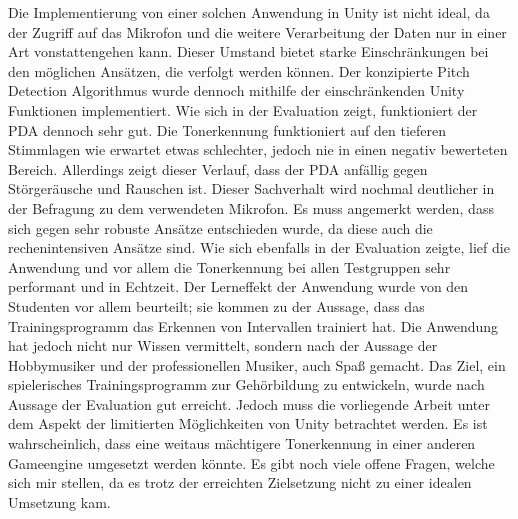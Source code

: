 Die Implementierung von einer solchen Anwendung in Unity ist nicht ideal, da der Zugriff auf das Mikrofon und die weitere Verarbeitung der Daten nur in einer Art vonstattengehen kann. Dieser Umstand bietet starke Einschränkungen bei den möglichen Ansätzen, die verfolgt werden können. Der konzipierte Pitch Detection Algorithmus wurde dennoch mithilfe der einschränkenden Unity Funktionen implementiert. Wie sich in der Evaluation zeigt, funktioniert der PDA dennoch sehr gut. Die Tonerkennung funktioniert auf den tieferen Stimmlagen wie erwartet etwas schlechter, jedoch nie in einen negativ bewerteten Bereich. Allerdings zeigt dieser Verlauf, dass der PDA anfällig gegen Störgeräusche und Rauschen ist. Dieser Sachverhalt wird nochmal deutlicher in der Befragung zu dem verwendeten Mikrofon. Es muss angemerkt werden, dass sich gegen sehr robuste Ansätze entschieden wurde, da diese auch die rechenintensiven Ansätze sind. Wie sich ebenfalls in der Evaluation zeigte, lief die Anwendung und vor allem die Tonerkennung bei allen Testgruppen sehr performant und in Echtzeit. Der Lerneffekt der Anwendung wurde von den Studenten vor allem beurteilt; sie kommen zu der Aussage, dass das Trainingsprogramm das Erkennen von Intervallen trainiert hat. Die Anwendung hat jedoch nicht nur Wissen vermittelt, sondern nach der Aussage der Hobbymusiker und der professionellen Musiker, auch Spaß gemacht. Das Ziel, ein spielerisches Trainingsprogramm zur Gehörbildung zu entwickeln, wurde nach Aussage der Evaluation gut erreicht. Jedoch muss die vorliegende Arbeit unter dem Aspekt der limitierten Möglichkeiten von Unity betrachtet werden. Es ist wahrscheinlich, dass eine weitaus mächtigere Tonerkennung in einer anderen Gameengine umgesetzt werden könnte. 
Es gibt noch viele offene Fragen, welche sich mir stellen, da es trotz der erreichten Zielsetzung nicht zu einer idealen Umsetzung kam. \\\\
